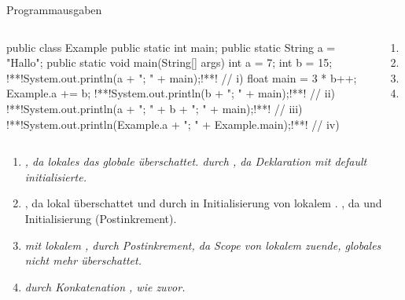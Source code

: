{\begin{frame}[c,fragile]{Programmausgaben}
\vspace*{-\baselineskip}\begin{columns}[onlytextwidth,c]
\begin{plainjava}
public class Example {
   public static int main;
   public static String a = "Hallo";
   public static void main(String[] args) {
      int a = 7;
      int b = 15;
      !**!System.out.println(a + "; " + main);!**! // i)
      {
         float main = 3 * b++;
         Example.a += b;
         !**!System.out.println(b + "; " + main);!**! // ii)
      }
      !**!System.out.println(a + "; " + b + "; " + main);!**! // iii)
      !**!System.out.println(Example.a + "; " + Example.main);!**! // iv)
   }
}
\end{plainjava}
\small{}%
\begin{enumerate}
   \itemsep4.5pt
   \item<3->[i)] 
   \item<5->[ii)] 
   \item<7->[iii)] 
   \item<9->[iv)] 
\end{enumerate}
\end{columns}
\vspace*{4mm}
{\scriptsize\begin{enumerate}
   \itemsep7pt
   \item<4->[i)] \textit{, da lokales  das globale  überschattet.  durch , da Deklaration mit default  initialisierte.}
   \item<6->[ii)] \textit{}, da lokal überschattet und durch  in Initialisierung von lokalem . , da  und Initialisierung  (Postinkrement).
   \item<8->[iii)] \textit{ mit lokalem ,  durch Postinkrement,  da Scope von lokalem  zuende, globales  nicht mehr überschattet.}
   \item<10->[iv)] \textit{ durch Konkatenation ,  wie zuvor.}

\end{enumerate}}
\end{frame}}
